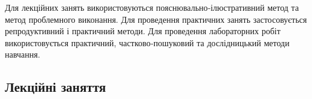 \documentclass{Syllabus}
\begin{document}
Для лекційних занять використовуються пояснювально‐ілюстративний метод та метод проблемного виконання.
Для проведення практичних занять застосовується репродуктивний і практичний методи.
Для проведення лабораторних робіт використовується практичний, частково‐пошуковий та дослідницький методи навчання.


\subsection*{Лекційні заняття}
\end{document}
